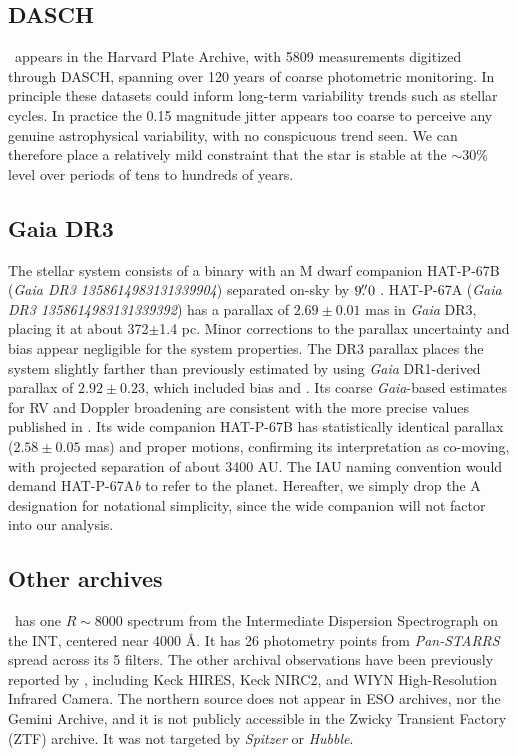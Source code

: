 \documentclass[twocolumn]{aastex631}
\newcommand{\hatp}{\object{HAT-P-67}~}
\begin{document}
\subsection{DASCH}
\hatp appears in the Harvard Plate Archive, with 5809 measurements digitized through DASCH, spanning over 120 years of coarse photometric monitoring.  In principle these datasets could inform long-term variability trends such as stellar cycles.  In practice the 0.15 magnitude jitter appears too coarse to perceive any genuine astrophysical variability, with no conspicuous trend seen.  We can therefore place a relatively mild constraint that the star is stable at the $\sim30\%$ level over periods of tens to hundreds of years.

\subsection{Gaia DR3}
The stellar system consists of a binary with an M dwarf companion HAT-P-67B (\emph{Gaia DR3 1358614983131339904}) separated on-sky by $9\mbox{$.\!\!^{\prime\prime}$}0$ \citep{2019MNRAS.490.5088M}.  HAT-P-67A (\emph{Gaia DR3 1358614983131339392}) has a parallax of $2.69\pm0.01$ mas in \emph{Gaia} DR3, placing it at about 372$\pm$1.4 pc.  Minor corrections to the parallax uncertainty \citep{2021MNRAS.506.2269E} and bias \citep{2021A&A...649A...4L} appear negligible for the system properties.  The DR3 parallax places the system slightly farther than previously estimated by \citet{2017AJ....153..211Z} using \emph{Gaia} DR1-derived parallax of $2.92\pm0.23$, which included bias and  . Its coarse \emph{Gaia}-based estimates for RV and Doppler broadening are consistent with the more precise values published in \citet{2017AJ....153..211Z}.  Its wide companion HAT-P-67B  \citep{2019MNRAS.490.5088M} has statistically identical parallax ($2.58\pm0.05$ mas) and proper motions, confirming its interpretation as co-moving, with projected separation of about 3400 AU.  The IAU naming convention would demand HAT-P-67A\emph{b} to refer to the planet.  Hereafter, we simply drop the A designation for notational simplicity, since the wide companion will not factor into our analysis.

\subsection{Other archives}
\hatp has one $R\sim8000$ spectrum from the Intermediate Dispersion Spectrograph on the INT, centered near 4000 \AA.  It has 26 photometry points from \emph{Pan-STARRS} spread across its 5 filters.  The other archival observations have been previously reported by \citet{2017AJ....153..211Z}, including Keck HIRES, Keck NIRC2, and WIYN High-Resolution Infrared Camera.  The northern source does not appear in ESO archives, nor the Gemini Archive, and it is not publicly accessible in the Zwicky Transient Factory (ZTF) archive.  It was not targeted by \emph{Spitzer} or \emph{Hubble}.
\end{document}
